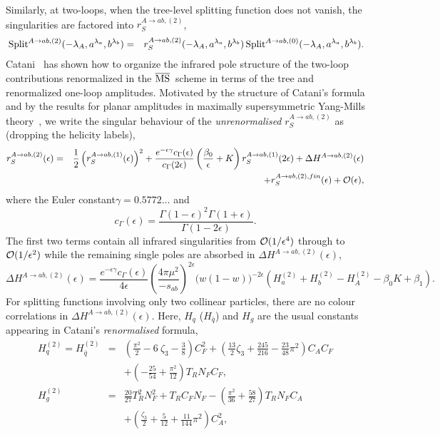 \documentclass[paper,notoc,nohyper]{JHEP3}
\def\MSbar{$\overline{{\rm MS}}$}
\def\e{\epsilon}
\def\Split{\, {\rm Split}}
\def\CA{C_A}
\def\CF{C_F}
\def\NF{N_F}
\def\e{\epsilon}
\begin{document}
Similarly, at two-loops,  when the tree-level splitting function does not vanish,
the singularities are factored into $r_{S}^{A \to ab,(2)}$,
\begin{eqnarray}
\label{eq:r2def}
\Split^{A \to ab,(2)}({-\lambda_A},a^{\lambda_a},b^{\lambda_b}) 
&=& r_{S}^{A \to ab,(2)}({-\lambda_A},a^{\lambda_a},b^{\lambda_b})
\Split^{A \to ab,(0)}({-\lambda_A},a^{\lambda_a},b^{\lambda_b}).
\end{eqnarray}
Catani~\cite{Catani:polestruc} has shown how to organize the 
infrared pole structure of the two-loop contributions renormalized in the 
\MSbar\ scheme in terms of the tree and renormalized one-loop amplitudes.
Motivated by the structure of Catani's formula and by the results for planar amplitudes in maximally supersymmetric
Yang-Mills theory~\cite{Anastasiou:planar}, 
we write the singular behaviour of the {\em unrenormalised} $r_{S}^{A \to ab,(2)}$ as (dropping the helicity labels),
\begin{eqnarray}
\label{eq:r2}
r_{S}^{A \to ab,(2)}(\e) &=& 
\frac{1}{2}\left(r_{S}^{A \to ab,(1)}(\e)\right)^2
+\frac{e^{-\epsilon\gamma}c_{\Gamma}(\e)}{c_{\Gamma}(2\e)}\left(\frac{\beta_0}{\e}+K\right )r_{S}^{A \to ab,(1)}(2\e)
+\Delta H^{A \to ab,(2)}(\e)\nonumber \\
&&
+r_{S}^{A \to ab,(2),fin}(\epsilon) + {\cal O}(\epsilon),
\end{eqnarray}
where the Euler constant$\gamma = 0.5772\ldots$ and
\begin{equation}
c_{\Gamma}(\e) = \frac{\Gamma(1-\e)^2\Gamma(1+\e)}{\Gamma(1-2\e)}.
\end{equation}
The first two terms contain all infrared singularities from ${\cal O}(1/\e^4)$ through to ${\cal O}(1/\e^2)$
while the remaining single poles are absorbed in $\Delta H^{A \to ab,(2)}(\e)$,
\begin{equation}
\Delta H^{A \to ab,(2)}(\e) = \frac{e^{-\epsilon\gamma}c_\Gamma(\e) }{4 \epsilon}
\left(\frac{4\pi\mu^2}{-s_{ab}}\right)^{2\epsilon}\big (w(1-w)\big)^{-2\e}
\left(H^{(2)}_a+H^{(2)}_b-H^{(2)}_A -\beta_0 K +\beta_1\right).
\end{equation}
For splitting functions involving only two collinear particles, 
there are no colour correlations in
$\Delta H^{A \to ab,(2)}(\e)$.
Here, $H_q$ ($H_{\bar q}$) and $H_g$ are the usual constants appearing in Catani's {\em renormalised} formula,
\begin{eqnarray}
\label{eq:defHq}
H_{q}^{(2)} =H_{\bar q}^{(2)} &=&\left(\frac{\pi^2}{2}-6 ~\zeta_3 
-\frac{3}{8}\right) \CF^2
+\left(\frac{13}{2}\zeta_3 +\frac{245}{216}-\frac{23}{48} \pi^2 \right) \CA \CF
\nonumber \\
&& + \left(-\frac{25}{54}+\frac{\pi^2}{12} \right) T_R \NF \CF, \\
\label{eq:defHg}
H_{g}^{(2)} &=& 
\frac{20}{27} T_R^2 \NF^2
+ T_R \CF \NF
-\left(\frac{ \pi^2}{36}+\frac{58}{27} \right)T_R \NF\CA
\nonumber \\ &&
+\left(\frac{\zeta_3}{2}+\frac{5}{12}
+\frac{11}{144}\pi^2 \right) \CA^2,
\end{eqnarray}
\end{document}
